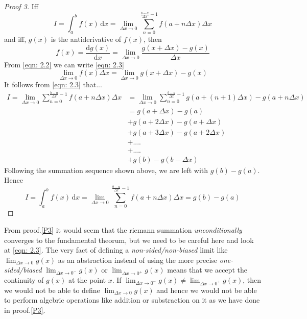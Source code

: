 \begin{proof}[Proof 3]\label{P3}
Iff
	\begin{equation}
	I = \int_{a}^{b}f(x)\,\mathrm{d}x = \lim_{\Delta x \to 0}\sum_{n=0}^{\frac{b-a}{\Delta x}-1}f(a + n \Delta x)\Delta x \label{eqn: 2.1}
	\end{equation}
and iff, $g(x)$ is the antiderivative of $f(x)$, then
\begin{equation}
	f(x) = \frac{\mathrm{d}g(x)}{\mathrm{d}x} = \lim_{\Delta x \to 0} \frac{g(x + \Delta x) - g(x)}{\Delta x} \label{eqn: 2.2}
\end{equation}
From \eqref{eqn: 2.2} we can write \eqref{eqn: 2.3}
\begin{equation}
	\lim_{\Delta x \to 0}f(x)\Delta x = \lim_{\Delta x \to 0} g(x + \Delta x) - g(x) \label{eqn: 2.3}
\end{equation}
It follows from \eqref{eqn: 2.3} that...
\begin{align*}
	I = \lim_{\Delta x \to 0}\sum_{n=0}^{\frac{b-a}{\Delta x}-1}f(a + n\Delta x) \Delta x &= \lim_{\Delta x \to 0}\sum_{n=0}^{\frac{b-a}{\Delta x}-1}g(a + (n+1)\Delta x) - g(a + n\Delta x)\\
	&= g(a + \Delta x) - g(a)\\
	&+ g(a + 2\Delta x) - g(a + \Delta x)\\
	&+ g(a + 3\Delta x) - g(a + 2\Delta x)\\
	&+ ....\\
	&+ ....\\
	&+ g(b) - g(b - \Delta x)&&
\end{align*}
Following the summation sequence shown above, we are left with $g(b) - g(a)$. Hence
\begin{equation}
		I = \int_{a}^{b}f(x)\,\mathrm{d}x = \lim_{\Delta x \to 0}\sum_{n=0}^{\frac{b-a}{\Delta x}-1}f(a + n \Delta x)\Delta x = g(b) - g(a)\label{eqn: 2.4}
\end{equation}
\end{proof}
From proof.\ref{P3} it would seem that the riemann summation \textit{unconditionally} converges to the fundamental theorum, but we need to be careful here and look at \eqref{eqn: 2.3}. The very fact of defining a \textit{non-sided/non-biased} limit like $\lim_{\Delta x \to 0} g(x)$ as an abstraction instead of using the more precise \textit{one-sided/biased} $\lim_{\Delta x \to 0^-}g(x)$ or $\lim_{\Delta x \to 0^+}g(x)$ means that we accept the continuity of $g(x)$ at the point $x$. If $\lim_{\Delta x \to 0^-}g(x) \neq \lim_{\Delta x \to 0^+}g(x)$, then we would not be able to define $\lim_{\Delta x \to 0}g(x)$ and hence we would not be able to perform algebric operations like addition or substraction on it as we have done in proof.\ref{P3}.\\

